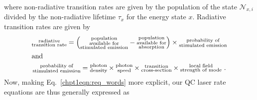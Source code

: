 {\begin{subequations}
\begin{align}
\end{align}
\end{subequations}
where non-radiative transition rates are given by the population of the state $\mathcal{N}_{x,i}$ divided by the non-radiative lifetime $\tau_x$ for the energy state $x$.  Radiative transition rates are given by
\begin{gather*}
\begin{subarray}{c}\textnormal{radiative}\\\textnormal{transition rate}\end{subarray} =
\left( \begin{subarray}{c}\textnormal{population}\\\textnormal{available for}\\\textnormal{stimulated emission}\end{subarray} - \begin{subarray}{c}\textnormal{population}\\\textnormal{available for}\\\textnormal{absorption}\end{subarray}\right) \times \begin{subarray}{c}\textnormal{probability of}\\\textnormal{stimulated emission}\end{subarray}\\
\intertext{and}
\begin{subarray}{c}\textnormal{probability of}\\\textnormal{stimulated emission}\end{subarray} = \begin{subarray}{c}\textnormal{photon}\\\textnormal{density}\end{subarray} \times \begin{subarray}{c}\textnormal{photon}\\\textnormal{speed}\end{subarray} \times \begin{subarray}{c}\textnormal{transition}\\\textnormal{cross-section}\end{subarray} \times
\begin{subarray}{c}\textnormal{local field}\\\textnormal{strength of mode}\end{subarray} \textnormal{~.}
\end{gather*}
Now, making Eq.~\eqref{chpt1eqn:req_words} more explicit, our QC laser rate equations are thus generally expressed as
\begin{subequations}
\label{chpt1eqn:req1}
\begin{align}

\end{align}
\end{subequations}}
